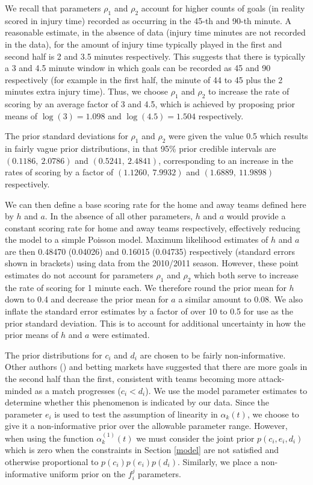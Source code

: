 We recall that parameters \(\rho_1\) and \(\rho_2\) account for higher counts of goals (in reality scored in injury
time) recorded as occurring in the 45-th and 90-th minute. A reasonable estimate, in the absence of data (injury time minutes
are not recorded in the data), for the amount of injury time typically played in the first and second half is 2 and 3.5
minutes respectively. This suggests that there is typically a 3 and 4.5 minute window in which goals can be recorded as
45 and 90 respectively (for example in the first half, the minute of 44 to 45 plus the 2 minutes extra injury time).
Thus, we choose \(\rho_1\) and \(\rho_2\) to increase the rate of scoring by an average factor of 3 and 4.5, which is
achieved by proposing prior means of \(\log(3) = 1.098\) and \(\log(4.5) = 1.504\) respectively.

The prior standard deviations for \(\rho_1\) and \(\rho_2\) were given the value 0.5 which results in fairly vague prior
distributions, in that 95\% prior credible intervals are \((0.1186,\ 2.0786)\) and \((0.5241,\ 2.4841)\), corresponding
to an increase in the rates of scoring by a factor of \((1.1260,\ 7.9932)\) and \((1.6889,\ 11.9898)\) respectively.

We can then define a base scoring rate for the home and away teams defined here by \(h\) and \(a\). In the absence of
all other parameters, \(h\) and \(a\) would provide a constant scoring rate for home and away teams respectively,
effectively reducing the model to a simple Poisson model. Maximum likelihood estimates of \(h\) and \(a\) are then
0.48470 (0.04026) and 0.16015 (0.04735) respectively (standard errors shown in brackets) using data from the 2010/2011
season. However, these point estimates do not account for parameters \(\rho_1\) and \(\rho_2\) which both serve to
increase the rate of scoring for 1 minute each. We therefore round the prior mean for \(h\) down to 0.4 and decrease the
prior mean for \(a\) a similar amount to 0.08. We also inflate the standard error estimates by a factor of over 10 to
0.5 for use as the prior standard deviation. This is to account for additional uncertainty in how the prior means of
\(h\) and \(a\) were estimated.

The prior distributions for \(c_i\) and \(d_i\) are chosen to be fairly non-informative. Other authors
(\cite{DixonRobinson1998}) and betting markets have suggested that there are more goals in the second half than the
first, consistent with teams becoming more attack-minded as a match progresses (\(c_i < d_i\)). We use the model
parameter estimates to determine whether this phenomenon is indicated by our data. Since the parameter \(e_i\) is used
to test the assumption of linearity in \(\alpha_k(t)\), we choose to give it a non-informative prior over the allowable
parameter range. However, when using the function \(\alpha^{(1)}_k(t)\) we must consider the joint prior \(p(c_i, e_i,
d_i)\) which is zero when the constraints in Section \ref{model} are not satisfied and otherwise proportional to
\(p(c_i) p(e_i) p(d_i)\). Similarly, we place a non-informative uniform prior on the \(f_i^j\) parameters.

